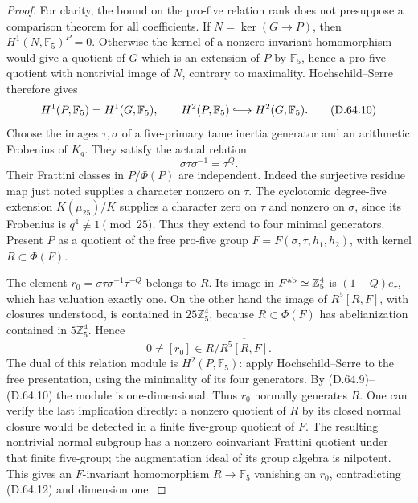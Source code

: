 \begin{proof}
For clarity, the bound on the pro-five relation rank does
not presuppose a comparison theorem for all coefficients.
If \(N=\ker(G\to P)\), then
\(H^1(N,\mathbb F_5)^P=0\). Otherwise the kernel of a
nonzero invariant homomorphism would give a quotient of
\(G\) which is an extension of \(P\) by \(\mathbb F_5\),
hence a pro-five quotient with nontrivial image of \(N\),
contrary to maximality. Hochschild--Serre therefore gives
\[
 H^1(P,\mathbb F_5)=H^1(G,\mathbb F_5),\qquad
 H^2(P,\mathbb F_5)\lhook\joinrel\longrightarrow
                                      H^2(G,\mathbb F_5).
                                                        \tag{D.64.10}
\]
Choose the images \(\tau,\sigma\) of a five-primary tame
inertia generator and an arithmetic Frobenius of \(K_q\).
They satisfy the actual relation
\[
                        \sigma\tau\sigma^{-1}=\tau^Q.
                                                        \tag{D.64.11}
\]
Their Frattini classes in \(P/\Phi(P)\) are independent.
Indeed the surjective residue map just noted supplies
a character nonzero on \(\tau\). The cyclotomic degree-five
extension \(K(\mu_{25})/K\) supplies a character zero on
\(\tau\) and nonzero on \(\sigma\), since its Frobenius
is \(q^4\not\equiv1\pmod{25}\). Thus they extend to four
minimal generators. Present \(P\) as a quotient of the
free pro-five group \(F=F(\sigma,\tau,h_1,h_2)\), with
kernel \(R\subset\Phi(F)\).

The element
\(r_0=\sigma\tau\sigma^{-1}\tau^{-Q}\) belongs to \(R\).
Its image in \(F^{\rm ab}\simeq\mathbb Z_5^4\) is
\((1-Q)e_\tau\), which has valuation exactly one.
On the other hand the image of
\(R^5[R,F]\), with closures understood, is contained
in \(25\mathbb Z_5^4\), because
\(R\subset\Phi(F)\) has abelianization contained in
\(5\mathbb Z_5^4\). Hence
\[
       0\ne[r_0]\in R/\overline{R^5[R,F]}.
                                                        \tag{D.64.12}
\]
The dual of this relation module is
\(H^2(P,\mathbb F_5)\): apply Hochschild--Serre to the
free presentation, using the minimality of its four
generators. By (D.64.9)--(D.64.10) the module is
one-dimensional. Thus \(r_0\) normally generates \(R\).
One can verify the last implication directly: a nonzero
quotient of \(R\) by its closed normal closure would be
detected in a finite five-group quotient of \(F\).
The resulting nontrivial normal subgroup has a nonzero
coinvariant Frattini quotient under that finite five-group;
the augmentation ideal of its group algebra is nilpotent.
This gives an \(F\)-invariant homomorphism
\(R\to\mathbb F_5\) vanishing on \(r_0\), contradicting
(D.64.12) and dimension one.


\end{proof}
